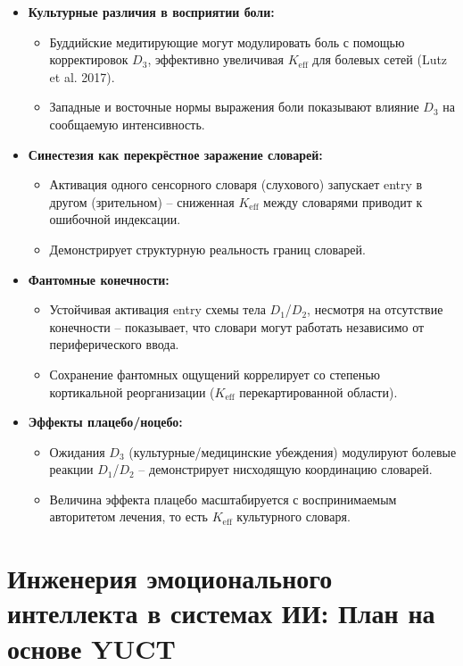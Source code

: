\documentclass[12pt,a4paper]{article}
\newcommand{\eff}{\mathrm{eff}}
\newcommand{\Ke}{K_{\eff}}
\begin{document}
	\begin{itemize}
		\item \textbf{Культурные различия в восприятии боли:}
		\begin{itemize}
			\item Буддийские медитирующие могут модулировать боль с помощью корректировок $D_3$, эффективно увеличивая $\Ke$ для болевых сетей (Lutz et al. 2017).
			\item Западные и восточные нормы выражения боли показывают влияние $D_3$ на сообщаемую интенсивность.
		\end{itemize}
		
		\item \textbf{Синестезия как перекрёстное заражение словарей:}
		\begin{itemize}
			\item Активация одного сенсорного словаря (слухового) запускает entry в другом (зрительном) – сниженная $\Ke$ между словарями приводит к ошибочной индексации.
			\item Демонстрирует структурную реальность границ словарей.
		\end{itemize}
		
		\item \textbf{Фантомные конечности:}
		\begin{itemize}
			\item Устойчивая активация entry схемы тела $D_1$/$D_2$, несмотря на отсутствие конечности – показывает, что словари могут работать независимо от периферического ввода.
			\item Сохранение фантомных ощущений коррелирует со степенью кортикальной реорганизации ($\Ke$ перекартированной области).
		\end{itemize}
		
		\item \textbf{Эффекты плацебо/ноцебо:}
		\begin{itemize}
			\item Ожидания $D_3$ (культурные/медицинские убеждения) модулируют болевые реакции $D_1$/$D_2$ – демонстрирует нисходящую координацию словарей.
			\item Величина эффекта плацебо масштабируется с воспринимаемым авторитетом лечения, то есть $\Ke$ культурного словаря.
		\end{itemize}
	\end{itemize}
	
	\section{Инженерия эмоционального интеллекта в системах ИИ: План на основе YUCT}
	
\end{document}
